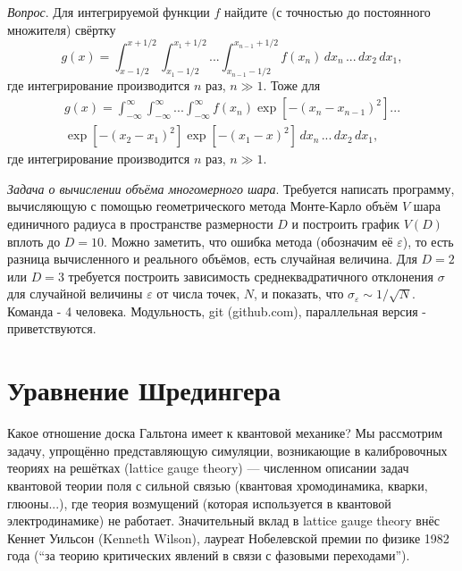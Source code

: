 \documentclass{book}
\begin{document}
\textit{Вопрос}. Для интегрируемой функции $f$ найдите (с точностью до постоянного множителя) свёртку
\begin{equation}
    g(x) = \int_{x - 1/2}^{x + 1/2} \int_{x_1 - 1/2}^{x_1 + 1/2} ... \int_{x_{n - 1} -
    1/2}^{x_{n - 1} + 1/2}
    f(x_n) \, dx_n \,
    ... \, dx_2 \, dx_1,
\end{equation}
где интегрирование производится $n$ раз, $n \gg 1$. Тоже для
\begin{multline}
    g(x) = \int_{-\infty}^\infty \int_{-\infty}^\infty ... \int_{-\infty}^\infty
    f(x_n) \exp\left[-(x_n - x_{n - 1})^2 \right] ...\\
    \exp\left[-(x_2 - x_1)^2 \right]
    \exp\left[-(x_1 - x)^2 \right]
    \, dx_n \, ... \, dx_2 \, dx_1,
\end{multline}
где интегрирование производится $n$ раз, $n \gg 1$.

\textit{Задача о вычислении объёма многомерного шара}. Требуется написать программу, вычисляющую с
помощью геометрического метода Монте-Карло объём $V$ шара единичного радиуса в пространстве
размерности $D$ и построить график $V(D)$ вплоть до $D = 10$. Можно заметить, что ошибка метода
(обозначим её $\varepsilon$), то есть разница вычисленного и реального объёмов, есть случайная
величина. Для $D = 2$ или $D = 3$ требуется построить зависимость среднеквадратичного отклонения
$\sigma$ для случайной величины $\varepsilon$ от числа точек, $N$, и показать, что
$\sigma_\varepsilon \sim 1 / \sqrt{N}$. Команда - 4 человека. Модульность, git (github.com),
параллельная версия - приветствуются.

\section{Уравнение Шредингера}

Какое отношение доска Гальтона имеет к квантовой механике? Мы рассмотрим задачу, упрощённо
представляющую симуляции, возникающие в калибровочных теориях на решётках (lattice gauge theory) ---
численном описании задач квантовой теории поля с сильной связью (квантовая хромодинамика, кварки,
глюоны...), где теория возмущений (которая используется в квантовой электродинамике) не работает.
Значительный вклад в lattice gauge theory внёс Кеннет Уильсон (Kenneth Wilson), лауреат Нобелевской
премии по физике 1982 года (``за теорию критических явлений в связи с фазовыми переходами'').
\end{document}
